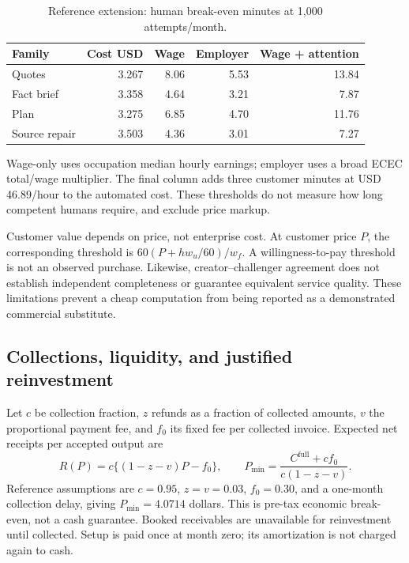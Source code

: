 \begin{table}[tbp]
\centering\small
\caption{Reference extension: human break-even minutes at 1,000 attempts/month.}
\label{tab:ec-thresholds}
\begin{tabular}{lrrrr}
\toprule
Family & Cost USD & Wage & Employer & Wage + attention \\
\midrule
Quotes & 3.267 & 8.06 & 5.53 & 13.84 \\
Fact brief & 3.358 & 4.64 & 3.21 & 7.87 \\
Plan & 3.275 & 6.85 & 4.70 & 11.76 \\
Source repair & 3.503 & 4.36 & 3.01 & 7.27 \\
\bottomrule
\end{tabular}
\par\smallskip\begin{minipage}{0.97\linewidth}\footnotesize Wage-only uses occupation median hourly earnings; employer uses a broad ECEC total/wage multiplier. The final column adds three customer minutes at USD 46.89/hour to the automated cost. These thresholds do not measure how long competent humans require, and exclude price markup.
\end{minipage}
\end{table}


Customer value depends on price, not enterprise cost. At customer price $P$,
the corresponding threshold is $60(P+hw_u/60)/w_f$. A willingness-to-pay
threshold is not an observed purchase. Likewise, creator--challenger agreement
does not establish independent completeness or guarantee equivalent service
quality. These limitations prevent a cheap computation from being reported
as a demonstrated commercial substitute.

\subsection{Collections, liquidity, and justified reinvestment}

Let $c$ be collection fraction, $z$ refunds as a fraction of collected amounts,
$v$ the proportional payment fee, and $f_0$ its fixed fee per collected invoice.
Expected net receipts per accepted output are
\begin{equation}
 R(P)=c\{(1-z-v)P-f_0\},\qquad
 P_{\min}=\frac{C^{\mathrm{full}}+cf_0}{c(1-z-v)}.
 \label{eq:ec-receipts}
\end{equation}
Reference assumptions are $c=0.95$, $z=v=0.03$, $f_0=0.30$, and a one-month
collection delay, giving $P_{\min}=4.0714$ dollars. This is pre-tax economic
break-even, not a cash guarantee. Booked receivables are unavailable for
reinvestment until collected. Setup is paid once at month zero; its
amortization is not charged again to cash.

